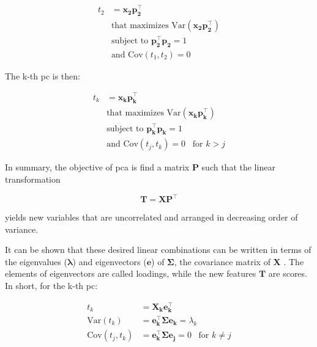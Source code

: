 \begin{equation}
	\label{eqn:pca-pc2}
	\begin{split}
		t_2 & =\mathbf{x_2 p_2^\intercal} \\
		& \text{that maximizes Var}(\mathbf{x_2 p_2^\intercal}) \\
		& \text{subject to }  \mathbf{p_2^\intercal p_2} = 1 \\
		& \text{and } \text{Cov}(t_1, t_2) = 0
	\end{split}
\end{equation}

The k-th \acrshort{pc} is then:

\begin{equation}
	\label{eqn:pca-pck}
	\begin{split}
		t_k & =\mathbf{x_k p_k^\intercal} \\
		& \text{that maximizes Var}(\mathbf{x_k p_k^\intercal}) \\
		& \text{subject to }  \mathbf{p_k^\intercal p_k} = 1 \\
		& \text{and } \text{Cov}(t_j, t_k) = 0 \;\;\; \text{for } k>j
	\end{split}
\end{equation}

In summary, the objective of \acrshort{pca} is find a matrix $\mathbf{P}$ such that the linear transformation

\begin{equation}
	\label{eqn:pca}
	\mathbf{T=XP^\intercal}
\end{equation}

yields new variables that are uncorrelated and arranged in decreasing order of variance.

It can be shown that these desired linear combinations can be written in terms of the eigenvalues ($\mathbf{\lambda}$) and eigenvectors ($\mathbf{e}$) of $\mathbf{\Sigma}$, the covariance matrix of $\mathbf{X}$ \parencite{johnson2013applied}. The elements of eigenvectors are called loadings, while the new features $\mathbf{T}$ are scores. In short, for the k-th \acrshort{pc}:

\begin{equation}
	\label{eqn:pca-eigen}
	\begin{split}
		t_k & =\mathbf{X_k e_k^\intercal} \\
		\text{Var}(t_k)& =  \mathbf{e_k^\intercal \Sigma e_k}=\lambda_k \\
		\text{Cov}(t_j, t_k)& = \mathbf{e_k^\intercal \Sigma e_j}= 0 \;\;\; \text{for } k\neq j
	\end{split}
\end{equation}

